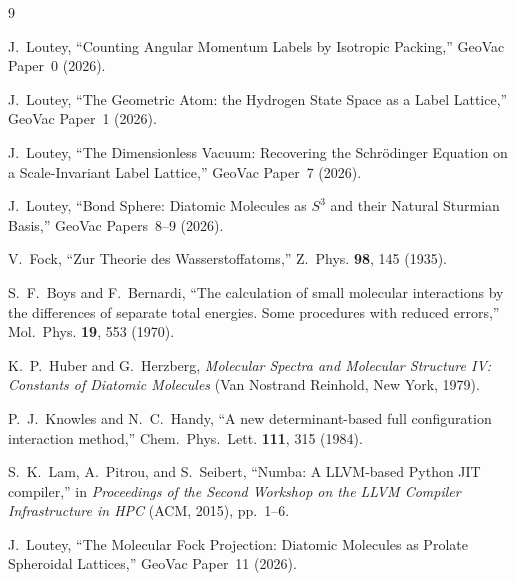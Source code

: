 \documentclass[aps,pra,twocolumn,superscriptaddress,longbibliography]{revtex4-2}
\begin{document}
\begin{thebibliography}{9}

J.~Loutey, ``Counting Angular Momentum Labels by Isotropic Packing,'' GeoVac Paper~0 (2026).

J.~Loutey, ``The Geometric Atom: the Hydrogen State Space as a Label Lattice,''
GeoVac Paper~1 (2026).

J.~Loutey, ``The Dimensionless Vacuum: Recovering the Schr\"odinger
Equation on a Scale-Invariant Label Lattice,'' GeoVac Paper~7 (2026).

J.~Loutey, ``Bond Sphere: Diatomic Molecules as $S^3$ and their Natural
Sturmian Basis,'' GeoVac Papers~8--9 (2026).

V.~Fock, ``Zur Theorie des Wasserstoffatoms,''
Z.~Phys. \textbf{98}, 145 (1935).

S.~F.~Boys and F.~Bernardi, ``The calculation of small molecular
interactions by the differences of separate total energies.  Some
procedures with reduced errors,''
Mol.~Phys. \textbf{19}, 553 (1970).

K.~P.~Huber and G.~Herzberg, \emph{Molecular Spectra and Molecular
Structure IV: Constants of Diatomic Molecules}
(Van Nostrand Reinhold, New York, 1979).

P.~J.~Knowles and N.~C.~Handy, ``A new determinant-based full
configuration interaction method,''
Chem.~Phys.~Lett. \textbf{111}, 315 (1984).

S.~K.~Lam, A.~Pitrou, and S.~Seibert, ``Numba: A LLVM-based Python
JIT compiler,'' in \emph{Proceedings of the Second Workshop on the LLVM
Compiler Infrastructure in HPC} (ACM, 2015), pp.~1--6.

J.~Loutey,
``The Molecular Fock Projection: Diatomic Molecules as Prolate
Spheroidal Lattices,''
GeoVac Paper~11 (2026).

\end{thebibliography}
\end{document}
